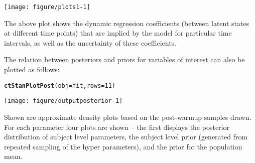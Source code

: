\documentclass[nojss]{jss}\usepackage[]{graphicx}\usepackage[]{color}
\makeatletter
\def\maxwidth{ %
  \ifdim\Gin@nat@width>\linewidth
    \linewidth
  \else
    \Gin@nat@width
  \fi
}
\newcommand{\hlnum}[1]{\textcolor[rgb]{0.686,0.059,0.569}{#1}}%
\newcommand{\hlstd}[1]{\textcolor[rgb]{0.345,0.345,0.345}{#1}}%
\newcommand{\hlkwc}[1]{\textcolor[rgb]{0.333,0.667,0.333}{#1}}%
\newcommand{\hlkwd}[1]{\textcolor[rgb]{0.737,0.353,0.396}{\textbf{#1}}}%
\newenvironment{kframe}{%
 \def\at@end@of@kframe{}%
 \ifinner\ifhmode%
  \def\at@end@of@kframe{\end{minipage}}%
  \begin{minipage}{\columnwidth}%
 \fi\fi%
 \def\FrameCommand##1{\hskip\@totalleftmargin \hskip-\fboxsep
 \colorbox{shadecolor}{##1}\hskip-\fboxsep
     \hskip-\linewidth \hskip-\@totalleftmargin \hskip\columnwidth}%
 \MakeFramed {\advance\hsize-\width
   \@totalleftmargin\z@ \linewidth\hsize
   \@setminipage}}%
 {\par\unskip\endMakeFramed%
 \at@end@of@kframe}
\newenvironment{knitrout}{}{} %
\makeatother
\begin{document}
\begin{knitrout}\small
{}\color{fgcolor}

{\centering \texttt{[image: figure/plots1-1]} 

}



\end{knitrout}

The above plot shows the dynamic regression coefficients (between latent states at different time points) that are implied by the model for particular time intervals, as well as the uncertainty of these coefficients.

The relation between posteriors and priors for variables of interest can also be plotted as follows:

\begin{knitrout}\small
{}\color{fgcolor}\begin{kframe}
\begin{alltt}
\hlkwd{ctStanPlotPost}\hlstd{(}\hlkwc{obj} \hlstd{= fit,} \hlkwc{rows}\hlstd{=}\hlnum{11}\hlstd{)}
\end{alltt}
\end{kframe}

{\centering \texttt{[image: figure/outputposterior-1]} 

}



\end{knitrout}

Shown are approximate density plots based on the post-warmup samples drawn. For each parameter four plots are shown -- the first displays the posterior distribution of subject level parameters, the subject level prior (generated from repeated sampling of the hyper parameters), and the prior for the population mean.
\end{document}
